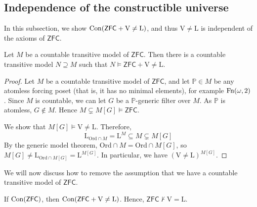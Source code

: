 \subsection{Independence of the constructible universe}
In this subsection, we show \( \operatorname{Con}(\mathsf{ZFC} + \mathrm{V} \neq \mathrm{L}) \), and thus \( \mathrm{V} \neq \mathrm{L} \) is independent of the axioms of \( \mathsf{ZFC} \).
\begin{theorem}
    Let \( M \) be a countable transitive model of \( \mathsf{ZFC} \).
    Then there is a countable transitive model \( N \supseteq M \) such that \( N \vDash \mathsf{ZFC} + \mathrm{V} \neq \mathrm{L} \).
\end{theorem}
\begin{proof}
    Let \( M \) be a countable transitive model of \( \mathsf{ZFC} \), and let \( \mathbb P \in M \) be any atomless forcing poset (that is, it has no minimal elements), for example \( \operatorname{Fn}(\omega, 2) \).
    Since \( M \) is countable, we can let \( G \) be a \( \mathbb P \)-generic filter over \( M \).
    As \( \mathbb P \) is atomless, \( G \notin M \).
    Hence \( M \subsetneq M[G] \vDash \mathsf{ZFC} \).

    We show that \( M[G] \vDash \mathrm{V} \neq \mathrm{L} \).
    Therefore,
    \[ \mathrm{L}_{\mathrm{Ord} \cap M} = \mathrm{L}^M \subseteq M \subsetneq M[G] \]
    By the generic model theorem, \( \mathrm{Ord} \cap M = \mathrm{Ord} \cap M[G] \), so \( M[G] \neq \mathrm{L}_{\mathrm{Ord} \cap M[G]} = \mathrm{L}^{M[G]} \).
    In particular, we have \( (\mathrm{V} \neq \mathrm{L})^{M[G]} \).
\end{proof}
We will now discuss how to remove the assumption that we have a countable transitive model of \( \mathsf{ZFC} \).
\begin{theorem}
    If \( \operatorname{Con}(\mathsf{ZFC}) \), then \( \operatorname{Con}(\mathsf{ZFC} + \mathrm{V} \neq \mathrm{L}) \).
    Hence, \( \mathsf{ZFC} \nvdash \mathrm{V} = \mathrm{L} \).
\end{theorem}
